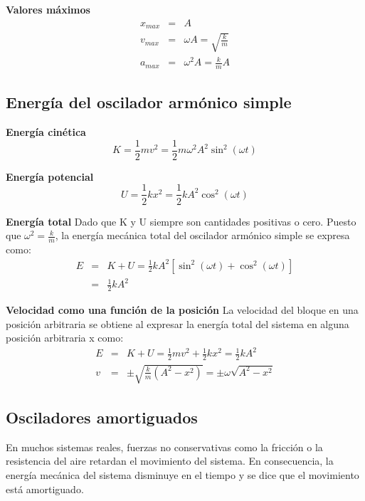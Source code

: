     \PN \textbf{Valores máximos}
    \begin{eqnarray*}
      x_{max} &=& A \\
      v_{max} &=& \omega A = \sqrt{\frac{k}{m}} \\
      a_{max} &=& \omega^{2} A = \frac{k}{m} A
    \end{eqnarray*}

  \subsection{Energía del oscilador armónico simple}
    \PN \textbf{Energía cinética}
    \begin{equation}
      K = \frac{1}{2} m v^{2} = \frac{1}{2} m \omega^{2} A^{2} \sin^{2} (\omega t)
    \end{equation}

    \PN \textbf{Energía potencial}
    \begin{equation}
      U = \frac{1}{2} k x^{2} = \frac{1}{2} k A^{2} \cos^{2} (\omega t)
    \end{equation}

    \PN \textbf{Energía total}
    \PN Dado que K y U siempre son cantidades positivas o cero. Puesto que $\omega^{2} = \frac{k}{m}$, la energía mecánica
    total del oscilador armónico simple se expresa como:
    \begin{eqnarray*}
      E &=& K + U = \frac{1}{2} k A^{2} [\sin^{2} (\omega t) + \cos^{2} (\omega t)] \\
      &=& \frac{1}{2} k A^{2}
    \end{eqnarray*}

    \pagebreak
    \PN \textbf{Velocidad como una función de la posición}
    \PN La velocidad del bloque en una posición arbitraria se obtiene al expresar la energía total del sistema en alguna
    posición arbitraria x como:
    \begin{eqnarray*}
      E &=& K + U = \frac{1}{2} m v^{2} + \frac{1}{2} k x^{2} = \frac{1}{2} k A^{2} \\
      v &=& \pm \sqrt{\frac{k}{m} (A^{2} - x^{2})} = \pm \omega \sqrt{A^{2} - x^{2}}
    \end{eqnarray*}

  \subsection{Osciladores amortiguados}
    \PN En muchos sistemas reales, fuerzas no conservativas como la fricción o la resistencia del aire retardan el
    movimiento del sistema. En consecuencia, la energía mecánica del sistema disminuye en el tiempo y se dice que el
    movimiento está amortiguado.

